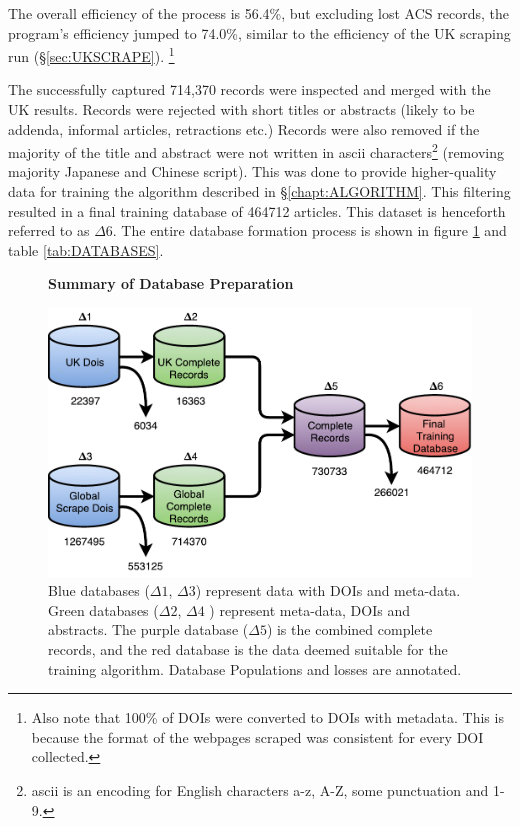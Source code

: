 The overall efficiency of the process is 56.4\%, but excluding lost ACS records, the program's efficiency jumped to 74.0\%, similar to the efficiency of the UK scraping run (\S\ref{sec:UKSCRAPE}). \footnote{Also note that 100\% of DOIs were converted to DOIs with metadata. This is because the format of the webpages scraped was consistent for every DOI collected.}

The successfully captured 714,370 records were inspected and merged with the UK results. Records were rejected with short titles or abstracts (likely to be addenda, informal articles, retractions etc.) Records were also removed if the majority of the title and abstract were not written in ascii characters\footnote{ascii is an encoding for English characters a-z, A-Z, some punctuation and 1-9.} (removing majority Japanese and Chinese script). This was done to provide higher-quality data for training the algorithm described in  \S\ref{chapt:ALGORITHM}. This filtering resulted in a final training database of 464712 articles. This dataset is henceforth referred to as $\Delta6$. The entire database formation process is shown in figure \ref{fig:DATABASES} and table \ref{tab:DATABASES}.
\begin{figure}[H]
    \centering
    \textbf{Summary of Database Preparation}\par\medskip
    \includegraphics[scale=0.6]{Data_Acquisition/Databases2.pdf}
    \caption[Summary of Database Preparation]{Blue databases ($\Delta1$, $\Delta3$) represent data with DOIs and meta-data. Green databases ($\Delta2$, $\Delta4$ ) represent meta-data, DOIs and abstracts. The purple database ($\Delta5$) is the combined complete records, and the red database is the data deemed suitable for the training algorithm. Database Populations and losses are annotated.}
     \label{fig:DATABASES}
\end{figure}
